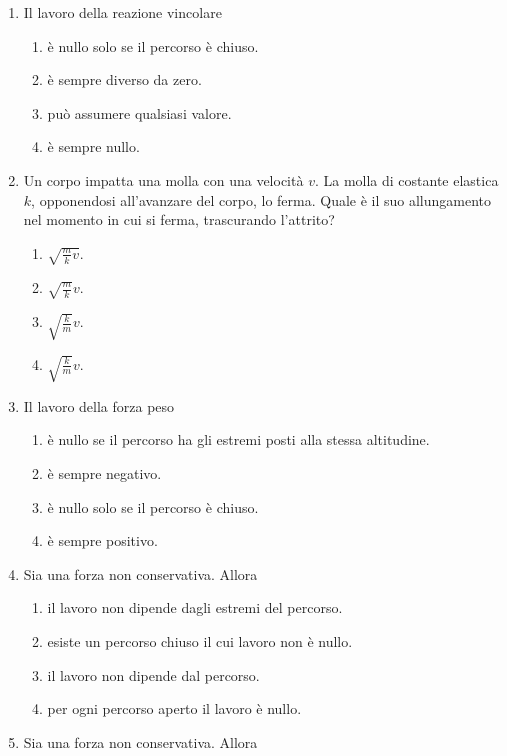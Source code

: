 \documentclass{article}
\begin{document}
\begin{enumerate}
\begin{enumerate}[label=\Alph*.]
  \end{enumerate}
  \item Il lavoro della reazione vincolare
  \begin{enumerate}[label=\Alph*.]
    \item è nullo solo se il percorso è chiuso.
    \item è sempre diverso da zero.
    \item può assumere qualsiasi valore.
    \item è sempre nullo.
  \end{enumerate}
  \item Un corpo impatta una molla con una velocità $v$. La molla di costante elastica $k$, opponendosi all'avanzare del corpo, lo ferma. Quale è il suo allungamento nel momento in cui si ferma, trascurando l'attrito?
  \begin{enumerate}[label=\Alph*.]
    \item $\sqrt{\frac{m}{k}v}$.
    \item $\sqrt{\frac{m}{k}}v$.
    \item $\sqrt{\frac{k}{m}}v$.
    \item $\sqrt{\frac{k}{m}}v$.
  \end{enumerate}
  \item Il lavoro della forza peso
  \begin{enumerate}[label=\Alph*.]
    \item è nullo se il percorso ha gli estremi posti alla stessa altitudine.
    \item è sempre negativo.
    \item è nullo solo se il percorso è chiuso.
    \item è sempre positivo.
  \end{enumerate}
  \item Sia  una forza non conservativa. Allora
  \begin{enumerate}[label=\Alph*.]
    \item il lavoro non dipende dagli estremi del percorso.
    \item esiste un percorso chiuso il cui lavoro non è nullo.
    \item il lavoro non dipende dal percorso.
    \item per ogni percorso aperto il lavoro è nullo.
  \end{enumerate}
  \item Sia  una forza non conservativa. Allora
  \begin{enumerate}[label=\Alph*.]

\end{enumerate}
\end{enumerate}
\end{document}
